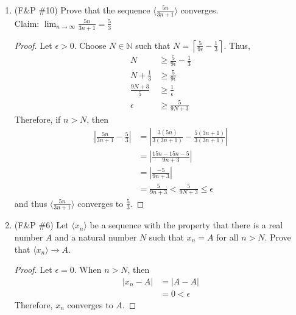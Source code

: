\documentclass{article}
\theoremstyle{problem}
\theoremstyle{plain}
\theoremstyle{remark}
\newcommand{\ceil}[1] {
  \left\lceil #1 \right\rceil
}
\newcommand{\abs}[1] {
  \left| #1 \right|
}
\begin{document}
\begin{enumerate}
\item (F\&P \#10) Prove that the sequence $\langle \frac{5n}{3n+1} \rangle$ converges. \\
  Claim: $\displaystyle \lim_{n \to \infty} \frac{5n}{3n+1} = \frac{5}{3}$
  \begin{proof}
    Let $\epsilon > 0$. Choose $N \in \mathbb N$ such that $N = \displaystyle \ceil{\frac{5}{9\epsilon} - \frac{1}{3}}$. Thus,
    \begin{align*}
      N &\geq \frac{5}{9\epsilon} - \frac{1}{3}\\
      N + \frac{1}{3} &\geq \frac{5}{9\epsilon}\\
      \frac{9N + 3}{5} &\geq \frac{1}{\epsilon}\\
      \epsilon &\geq \frac{5}{9N + 3}
    \end{align*}
    Therefore, if $n > N$, then
    \begin{align*}
      \abs{\frac{5n}{3n+1} - \frac{5}{3}} &= \abs{\frac{3(5n)}{3(3n+1)} - \frac{5(3n+1)}{3(3n+1)}}\\
      &= \abs{\frac{15n - 15n - 5}{9n+3}}\\
      &= \abs{\frac{-5}{9n+3}}\\
      &= \frac{5}{9n+3} < \frac{5}{9N+3} \leq \epsilon
    \end{align*}
    and thus $\langle \frac{5n}{3n+1} \rangle$ converges to $\displaystyle \frac{5}{3}$.
\end{proof}
\item (F\&P \#6) Let $\langle x_n \rangle$ be a sequence with the property that there is a real number $A$ and a natural number $N$ such that $x_n = A$ for all $n > N$. Prove that $\langle x_n \rangle \to A$.
\begin{proof}
  Let $\epsilon = 0$. When $n > N$, then 
  \begin{align*}
    \abs{x_n - A} &= \abs{A - A}\\
    &= 0 < \epsilon
  \end{align*}
  Therefore, $x_n$ converges to $A$.
\end{proof}


\end{enumerate}
\end{document}
